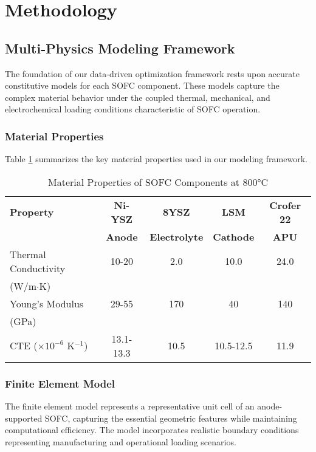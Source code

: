 \documentclass[11pt,a4paper]{article}
\begin{document}
\section{Methodology}

\subsection{Multi-Physics Modeling Framework}

The foundation of our data-driven optimization framework rests upon accurate constitutive models for each SOFC component. These models capture the complex material behavior under the coupled thermal, mechanical, and electrochemical loading conditions characteristic of SOFC operation.

\subsubsection{Material Properties}

Table \ref{tab:properties} summarizes the key material properties used in our modeling framework.

\begin{table}[H]
\centering
\caption{Material Properties of SOFC Components at 800°C}
\label{tab:properties}
\begin{tabular}{@{}lcccc@{}}
\toprule
\textbf{Property} & \textbf{Ni-YSZ} & \textbf{8YSZ} & \textbf{LSM} & \textbf{Crofer 22} \\
 & \textbf{Anode} & \textbf{Electrolyte} & \textbf{Cathode} & \textbf{APU} \\
\midrule
Thermal Conductivity & 10-20 & 2.0 & 10.0 & 24.0 \\
(W/m$\cdot$K) & & & & \\
Young's Modulus & 29-55 & 170 & 40 & 140 \\
(GPa) & & & & \\
CTE ($\times 10^{-6}$ K$^{-1}$) & 13.1-13.3 & 10.5 & 10.5-12.5 & 11.9 \\
\bottomrule
\end{tabular}
\end{table}

\subsubsection{Finite Element Model}

The finite element model represents a representative unit cell of an anode-supported SOFC, capturing the essential geometric features while maintaining computational efficiency. The model incorporates realistic boundary conditions representing manufacturing and operational loading scenarios.
\end{document}
